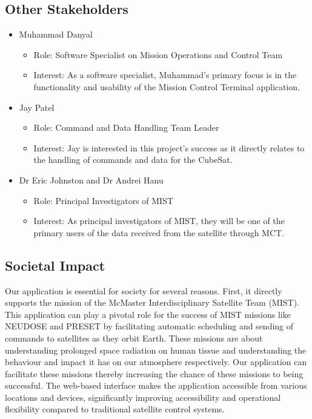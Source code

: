 \documentclass[12pt]{article}
\begin{document}
\subsection{Other Stakeholders}
\begin{itemize}
    \item Muhammad Danyal
    \begin{itemize}
        \item Role: Software Specialist on Mission Operations and Control Team
        \item Interest: As a software specialist, Muhammad’s primary focus is in the functionality and usability of the Mission Control Terminal application.

    \end{itemize}
    \item Jay Patel
    \begin{itemize}
        \item Role: Command and Data Handling Team Leader
        \item Interest: Jay is interested in this project’s success as it directly relates to the handling of commands and data for the CubeSat.

    \end{itemize}
    \item Dr Eric Johnston and Dr Andrei Hanu
    \begin{itemize}
        \item Role: Principal Investigators of MIST
        \item Interest: As principal investigators of MIST, they will be one of the primary users of the data received from the satellite through MCT.
    \end{itemize}
\end{itemize}

\subsection{Societal Impact}
Our application is essential for society for several reasons. First, it directly supports the mission of the McMaster Interdisciplinary Satellite Team (MIST). This application can play a pivotal role for the success of MIST missions like NEUDOSE and PRESET by facilitating automatic scheduling and sending of commands to satellites as they orbit Earth. These missions are about understanding prolonged space radiation on human tissue and understanding the behaviour and impact it has on our atmosphere respectively. Our application can facilitate these missions thereby increasing the chance of these missions to being successful. The web-based interface makes the application accessible from various locations and devices, significantly improving accessibility and operational flexibility compared to traditional satellite control systems.
\end{document}
